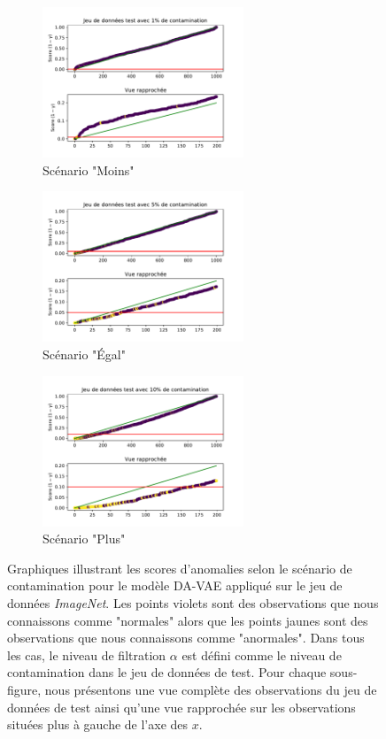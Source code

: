 \begin{figure}[htb]
	\centering
	\begin{subfigure}{6cm}
		\centering\includegraphics[width=6cm]{images/images_davae/pvalues_scenario_cars_moins}
		\caption{Scénario "Moins"}
	\end{subfigure}
	\begin{subfigure}{6cm}
		\centering\includegraphics[width=6cm]{images/images_davae/pvalues_scenario_cars_egal}
		\caption{Scénario "Égal"}
	\end{subfigure}
	\begin{subfigure}{6cm}
		\centering\includegraphics[width=6cm]{images/images_davae/pvalues_scenario_cars_plus}
		\caption{Scénario "Plus"}
	\end{subfigure}
	\caption{Graphiques illustrant les scores d'anomalies selon le scénario de contamination pour le modèle DA-VAE appliqué sur le jeu de données \textit{ImageNet}. Les points violets sont des observations que nous connaissons comme "normales" alors que les points jaunes sont des observations que nous connaissons comme "anormales". Dans tous les cas, le niveau de filtration $\alpha$ est défini comme le niveau de contamination dans le jeu de données de test. Pour chaque sous-figure, nous présentons une vue complète des observations du jeu de données de test ainsi qu'une vue rapprochée sur les observations situées plus à gauche de l'axe des $x$.} 
	\label{fig:pvalues_scenarios}
\end{figure}

